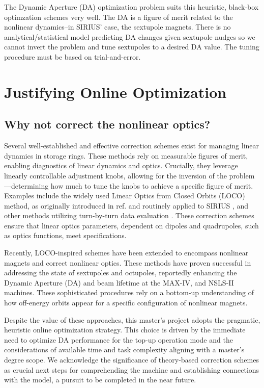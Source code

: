 The Dynamic Aperture (DA) optimization problem suits this heuristic, black-box optimzation schemes very well. The DA is a figure of merit related to the nonlinear dynamics--in SIRIUS' case, the sextupole magnets. There is no analytical/statistical model predicting DA changes given sextupole nudges so we cannot invert the problem and tune sextupoles to a desired DA value. The tuning procedure must be based on trial-and-error.

\section{Justifying Online Optimization}
\subsection{Why not correct the nonlinear optics?}
Several well-established and effective correction schemes exist for managing linear dynamics in storage rings. These methods rely on measurable figures of merit, enabling diagnostics of linear dynamics and optics. Crucially, they leverage linearly controllable adjustment knobs, allowing for the inversion of the problem—determining how much to tune the knobs to achieve a specific figure of merit. Examples include the widely used Linear Optics from Closed Orbits (LOCO) method, as originally introduced in ref.\cite{safranek_experimental_1997} and routinely applied to SIRIUS \cite{alves_linear_2021, alves_optics_2021}, and other methods utilizing turn-by-turn data evaluation \cite[chapter 5]{huang_beam-based_2019}. These correction schemes ensure that linear optics parameters, dependent on dipoles and quadrupoles, such as optics functions, meet specifications.

Recently, LOCO-inspired schemes have been extended to encompass nonlinear magnets and correct nonlinear optics. These methods have proven successful in addressing the state of sextupoles and octupoles, reportedly enhancing the Dynamic Aperture (DA) and beam lifetime at the MAX-IV, \cite{olsson_nonlinear_2020} and NSLS-II \cite{li_nonlinear_2024} machines. These sophisticated procedures rely on a bottom-up understanding of how off-energy orbits appear for a specific configuration of nonlinear magnets.

Despite the value of these approaches, this master's project adopts the pragmatic, heuristic online optimization strategy. This choice is driven by the immediate need to optimize DA performance for the top-up operation mode and the considerations of available time and task complexity aligning with a master's degree scope. We acknowledge the significance of theory-based correction schemes as crucial next steps for comprehending the machine and establishing connections with the model, a pursuit to be completed in the near future.

